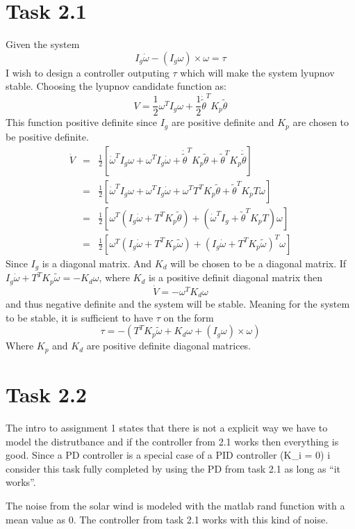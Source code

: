 \documentclass[11pt]{article}
\begin{document}
\section*{Task 2.1}
Given the system
\[I_g \dot \omega - (I_g \omega) \times \omega = \tau \]
I wish to design a controller outputing $\tau$ which will make the system lyupnov stable. Choosing the lyupnov candidate function as:
\[V = \frac{1}{2} \omega^T I_g \omega + \frac{1}{2} \dot \tilde \theta^T K_p \tilde \theta \]
This function  positive definite since $I_g$ are positive definite and $K_p$ are chosen to be positive definite.
\begin{eqnarray*}
\dot V &=& \frac{1}{2} [ \dot \omega^T I_g \omega + \omega^T I_g \dot \omega + \dot \tilde \theta^T K_p \tilde \theta + \tilde \theta^T K_p \dot \tilde \theta ] \\
&=& \frac{1}{2} [ \dot \omega^T I_g \omega + \omega^T I_g \dot \omega + \omega^T T^T K_p \tilde \theta + \tilde \theta^T K_p T \omega ] \\
&=& \frac{1}{2} [\omega^T ( I_g \dot \omega + T^T K_p \tilde \theta) + (\dot \omega^T I_g + \tilde \theta^T K_p T) \omega ] \\
&=& \frac{1}{2} [\omega^T (I_g \dot \omega + T^T K_p \tilde \omega) + (I_g \dot \omega + T^T K_p \tilde \omega)^T \omega ] 
\end{eqnarray*}
Since $I_g$ is a diagonal matrix. And $K_d$ will be chosen to be a diagonal matrix. If $I_g \dot \omega + T^T K_p \tilde \omega = - K_d \omega$, where $K_d$ is a positive definit diagonal matrix then 
\[\dot V = - \omega^T K_d \omega \]
and thus negative definite and the system will be stable. Meaning for the system to be stable, it is sufficient to have $\tau$ on the form
\[ \tau = -(T^T K_p \tilde \omega + K_d \omega + (I_g \omega) \times \omega) \]
Where $K_p$ and $K_d$ are positive definite diagonal matrices.



\section*{Task 2.2}
The intro to assignment 1 states that there is not a explicit way we have to model the distrutbance and if the controller from 2.1 works then everything is good. Since a PD controller is a special case of a PID controller (K_i = 0) i consider this task fully completed by using the PD from task 2.1 as long as ``it works''. 

The noise from the solar wind is modeled with the matlab rand function with a mean value as 0. The controller from task 2.1 works with this kind of noise.
\end{document}
